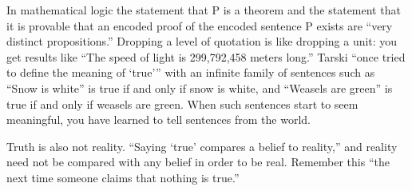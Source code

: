 In mathematical logic the statement that P is a theorem and the statement that it is provable that an encoded proof of the encoded sentence P exists are ``very distinct propositions.'' Dropping a level of quotation is like dropping a unit: you get results like ``The speed of light is 299,792,458 meters long.'' Tarski ``once tried to define the meaning of `true''' with an infinite family of sentences such as ``Snow is white'' is true if and only if snow is white, and ``Weasels are green'' is true if and only if weasels are green.  When such sentences start to seem meaningful, you have learned to tell sentences from the world.

Truth is also not reality. ``Saying `true' compares a belief to reality,'' and reality need not be compared with any belief in order to be real. Remember this ``the next time someone claims that nothing is true.''
